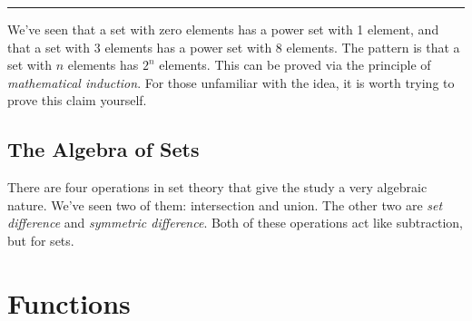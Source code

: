             \hrule\par\hfill\par
            We've seen that a set with zero elements has a power set with 1
            element, and that a set with 3 elements has a power set with 8
            elements. The pattern is that a set with $n$ elements has
            $2^{n}$ elements. This can be proved via the principle of
            \textit{mathematical induction}. For those unfamiliar with the
            idea, it is worth trying to prove this claim yourself.
        \subsection{The Algebra of Sets}
            There are four operations in set theory that give the study a very
            algebraic nature. We've seen two of them: intersection and union.
            The other two are \textit{set difference} and
            \textit{symmetric difference}. Both of these operations act like
            subtraction, but for sets.
    \section{Functions}
